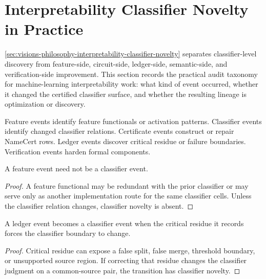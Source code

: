 \section{Interpretability Classifier Novelty in Practice}
\label{sec:visions-philosophy-interpretability-classifier-novelty-practice}

\autoref{sec:visions-philosophy-interpretability-classifier-novelty}
separates classifier-level discovery from feature-side, circuit-side,
ledger-side, semantic-side, and verification-side improvement. This
section records the practical audit taxonomy for machine-learning
interpretability work: what kind of event occurred, whether it changed
the certified classifier surface, and whether the resulting lineage is
optimization or discovery.

\begin{definition}
\label{def:philosophy-interpretability-event-kinds}
Feature events identify feature functionals or activation patterns.
Classifier events identify changed classifier relations. Certificate
events construct or repair NameCert rows. Ledger events discover
critical residue or failure boundaries. Verification events harden
formal components.
\end{definition}

\begin{theorem}
\label{thm:philosophy-feature-events-not-classifier-events}
A feature event need not be a classifier event.
\end{theorem}
\begin{proof}
A feature functional may be redundant with the prior classifier or may
serve only as another implementation route for the same classifier
cells. Unless the classifier relation changes, classifier novelty is
absent.
\end{proof}

\begin{theorem}
\label{thm:philosophy-ledger-events-can-become-classifier-events}
A ledger event becomes a classifier event when the critical residue it
records forces the classifier boundary to change.
\end{theorem}
\begin{proof}
Critical residue can expose a false split, false merge, threshold
boundary, or unsupported source region. If correcting that residue
changes the classifier judgment on a common-source pair, the transition
has classifier novelty.
\end{proof}

